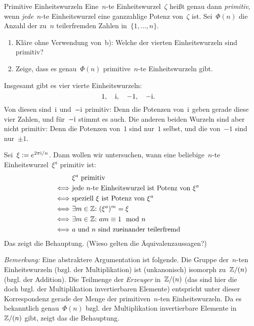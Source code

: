 \documentclass{algblatt}
\begin{document}
\ifloesungen\newpage\fi
\begin{aufgabe}{Primitive Einheitswurzeln}
Eine~$n$-te Einheitswurzel~$\zeta$ heißt genau dann \emph{primitiv}, wenn
\emph{jede}~$n$-te Einheitswurzel eine ganzzahlige Potenz von~$\zeta$ ist.
Sei~$\Phi(n)$ die Anzahl der zu~$n$ teilerfremden Zahlen
in~$\{1,\ldots,n\}$.
\begin{enumerate}
\item Kläre ohne Verwendung von~b): Welche der vierten Einheitswurzeln sind
primitiv?
\item Zeige, dass es genau~$\Phi(n)$ primitive~$n$-te
Einheitswurzeln gibt.
\end{enumerate}
\begin{loesungE}
\item Insgesamt gibt es vier vierte Einheitswurzeln:
\[ 1,\quad \mathrm{i},\quad -1,\quad -\mathrm{i}. \]
Von diesen sind~$\mathrm{i}$ und~$-\mathrm{i}$ primitiv: Denn die Potenzen von~$\mathrm{i}$ geben
gerade diese vier Zahlen, und für~$-\mathrm{i}$ stimmt es auch. Die anderen beiden
Wurzeln sind aber nicht primitiv: Denn die Potenzen von~$1$ sind nur~$1$
selbst, und die von~$-1$ sind nur~$\pm 1$.

\item Sei~$\xi := e^{2\pi\mathrm{i}/n}$. Dann wollen wir untersuchen, wann eine
beliebige~$n$-te Einheitswurzel~$\xi^a$ primitiv ist:
\begin{align*}
  & \text{$\xi^a$ primitiv} \\
  \Longleftrightarrow\ &
    \text{jede $n$-te Einheitswurzel ist Potenz von~$\xi^a$} \\
  \Longleftrightarrow\ &
    \text{speziell~$\xi$ ist Potenz von~$\xi^a$} \\
  \Longleftrightarrow\ &
    \exists m \in \ZZ{:}\ 
    (\xi^a)^m = \xi \\
  \Longleftrightarrow\ &
    \exists m \in \ZZ{:}\ 
    am \equiv 1 \mod n \\
  \Longleftrightarrow\ &
    \text{$a$ und $n$ sind zueinander teilerfremd}
\end{align*}
Das zeigt die Behauptung. (Wieso gelten die Äquivalenzaussagen?)

\emph{Bemerkung:} Eine abstraktere Argumentation ist folgende. Die Gruppe
der~$n$-ten Einheitswurzeln (bzgl. der Multiplikation) ist (unkanonisch)
isomorph zu~$\mathbb{Z}/(n)$ (bzgl. der Addition). Die Teilmenge der \emph{Erzeuger}
in~$\mathbb{Z}/(n)$ (das sind hier die doch bzgl. der Multiplikation invertierbaren
Elemente) entspricht unter dieser Korrespondenz gerade der Menge der
primitiven~$n$-ten Einheitswurzeln. Da es bekanntlich genau~$\Phi(n)$ bzgl. der
Multiplikation invertierbare Elemente in~$\mathbb{Z}/(n)$ gibt, zeigt das die
Behauptung.
\end{loesungE}
\end{aufgabe}
\end{document}
